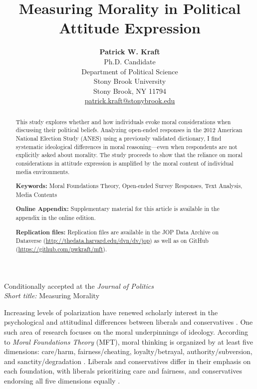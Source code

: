 \documentclass[12pt]{article}
\title{Measuring Morality in Political Attitude Expression}
\author{\textbf{Patrick W. Kraft}\\Ph.D. Candidate\\Department of Political Science\\Stony Brook University\\ Stony Brook, NY 11794\\\href{mailto:patrick.kraft@stonybrook.edu}{patrick.kraft@stonybrook.edu}}
\date{}
\begin{document}
\maketitle
\doublespacing
\thispagestyle{empty}

\begin{center}\large
Conditionally accepted at the \textit{Journal of Politics}\\
\textit{Short title:} Measuring Morality
\end{center}

\clearpage\thispagestyle{empty}
\begin{abstract}
This study explores whether and how individuals evoke moral considerations when discussing their political beliefs. Analyzing open-ended responses in the 2012 American National Election Study (ANES) using a previously validated dictionary, I find systematic ideological differences in moral reasoning---even when respondents are not explicitly asked about morality. The study proceeds to show that the reliance on moral considerations in attitude expression is amplified by the moral content of individual media environments.

\vspace{\baselineskip}
\noindent \textbf{Keywords:} Moral Foundations Theory, Open-ended Survey Responses, Text Analysis, Media Contents

\vspace{\baselineskip}
\noindent \textbf{Online Appendix:} Supplementary material for this article is available in the appendix in the online edition.

\vspace{\baselineskip}
\noindent \textbf{Replication files:} Replication files are available in the JOP Data Archive on Dataverse (\url{http://thedata.harvard.edu/dvn/dv/jop}) as well as on GitHub (\url{https://github.com/pwkraft/mft}).
\end{abstract}


\newpage
\setcounter{page}{1}

Increasing levels of polarization have renewed scholarly interest in the psychological and attitudinal differences between liberals and conservatives \citep{jost2006end}. One such area of research focuses on the moral underpinnings of ideology. According to \textit{Moral Foundations Theory} (MFT), moral thinking is organized by at least five dimensions: care/harm, fairness/cheating, loyalty/betrayal, authority/subversion, and sanctity/degradation \citep{graham2013moral}. Liberals and conservatives differ in their emphasis on each foundation, with liberals prioritizing care and fairness, and conservatives endorsing all five dimensions equally \citep{graham2009liberals}.
\end{document}
